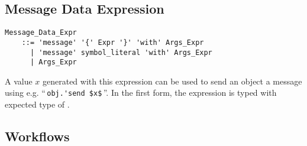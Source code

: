 \subsection{Message Data Expression}
\label{sec:message-data-expression}

\grammar\begin{lstlisting}
Message_Data_Expr
    ::= 'message' '{' Expr '}' 'with' Args_Expr
      | 'message' symbol_literal 'with' Args_Expr
      | Args_Expr
\end{lstlisting}

A value $x$ generated with this expression can be used to send an object a message using e.g. ``\,\lstinline!obj.'send $x$!\,''. In the first form, the expression is typed with expected type of . 





\subsection{Workflows}
\label{sec:workflows}

